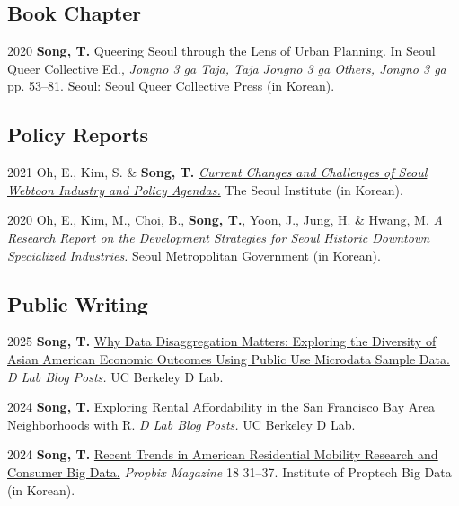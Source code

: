 \documentclass[11pt,letterpaper]{article}
\begin{document}
\subsection{Book Chapter}
\begin{tablist}
  \item[2020] \tab{}\textbf{Song, T.} Queering Seoul through the Lens of Urban Planning. In Seoul Queer Collective Ed., \emph{\href{http://www.kyobobook.co.kr/product/detailViewKor.laf?ejkGb=KOR&mallGb=KOR&barcode=9791197096501}{Jongno 3 ga Taja, Taja Jongno 3 ga Others, Jongno 3 ga}} pp. 53–81. Seoul: Seoul Queer Collective Press (in Korean).
\end{tablist}

\subsection{Policy Reports}
\begin{tablist}
  \item[2021] \tab{}Oh, E., Kim, S. \& \textbf{Song, T.} \emph{\href{https://www.si.re.kr/bbs/view.do?key=2024100039&pstSn=2111190001}{Current Changes and Challenges of Seoul Webtoon Industry and Policy Agendas.}} The Seoul Institute (in Korean).
  \item[2020] \tab{}Oh, E., Kim, M., Choi, B., \textbf{Song, T.}, Yoon, J., Jung, H. \& Hwang, M. \emph{A Research Report on the Development Strategies for Seoul Historic Downtown Specialized Industries.} Seoul Metropolitan Government (in Korean).
\end{tablist}

\subsection{Public Writing}
\begin{tablist}
  \item[2025] \tab{}\textbf{Song, T.} \href{https://medium.com/@dlab-berkeley/why-data-disaggregation-matters-exploring-the-diversity-of-asian-american-economic-outcomes-using-8b96e5dcc9a4}{Why Data Disaggregation Matters: Exploring the Diversity of Asian American Economic Outcomes Using Public Use Microdata Sample Data.} \emph{D Lab Blog Posts.} UC Berkeley D Lab.
  \item[2024] \tab{}\textbf{Song, T.} \href{https://medium.com/@dlab-berkeley/exploring-rental-affordability-in-the-san-francisco-bay-area-neighborhoods-with-r-c4383f7553e7}{Exploring Rental Affordability in the San Francisco Bay Area Neighborhoods with R.} \emph{D Lab Blog Posts.} UC Berkeley D Lab.
  \item[2024] \tab{}\textbf{Song, T.} \href{https://www.kahps.org/data/prbx/pdf_44_7}{Recent Trends in American Residential Mobility Research and Consumer Big Data.} \emph{Propbix Magazine} 18 31–37. Institute of Proptech Big Data (in Korean).
\end{tablist}
\end{document}
